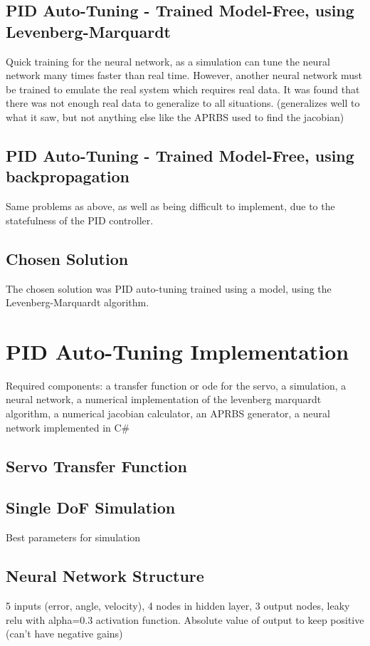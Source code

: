 \documentclass[letterpaper,12pt]{article}
\begin{document}
\subsection{PID Auto-Tuning - Trained Model-Free, using Levenberg-Marquardt}
Quick training for the neural network, as a simulation can tune the neural network many times faster than real time. However, another neural network must be trained to emulate the real system which requires real data. It was found that there was not enough real data to generalize to all situations. (generalizes well to what it saw, but not anything else like the APRBS used to find the jacobian)
\subsection{PID Auto-Tuning - Trained Model-Free, using backpropagation}
Same problems as above, as well as being difficult to implement, due to the statefulness of the PID controller.

\subsection{Chosen Solution}
The chosen solution was PID auto-tuning trained using a model, using the Levenberg-Marquardt algorithm.

\section{PID Auto-Tuning Implementation}
Required components: a transfer function or ode for the servo, a simulation, a neural network, a numerical implementation of the levenberg marquardt algorithm, a numerical jacobian calculator, an APRBS generator, a neural network implemented in C\#
\subsection{Servo Transfer Function}

\subsection{Single DoF Simulation}
Best parameters for simulation

\subsection{Neural Network Structure}
5 inputs (error, angle, velocity), 4 nodes in hidden layer, 3 output nodes, leaky relu with alpha=0.3 activation function. Absolute value of output to keep positive (can't have negative gains)
\end{document}

